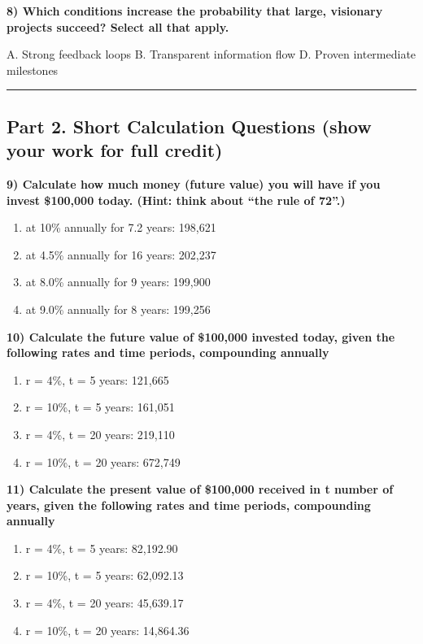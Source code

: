 \documentclass[
  12pt,
]{article}
\providecommand{\tightlist}{%
  \setlength{\itemsep}{0pt}\setlength{\parskip}{0pt}}
\begin{document}
\textbf{8) Which conditions increase the probability that large,
visionary projects succeed? Select all that apply.}

A. Strong feedback loops B. Transparent information flow D. Proven
intermediate milestones

\begin{center}\rule{0.5\linewidth}{0.5pt}\end{center}

\subsection{Part 2. Short Calculation Questions (show your work for full
credit)}\label{part-2.-short-calculation-questions-show-your-work-for-full-credit}

\textbf{9) Calculate how much money (future value) you will have if you
invest \$100,000 today. (Hint: think about ``the rule of 72''.)}

\begin{enumerate}
\def\labelenumi{\alph{enumi}.}
\tightlist
\item
  at 10\% annually for 7.2 years: 198,621
\item
  at 4.5\% annually for 16 years: 202,237
\item
  at 8.0\% annually for 9 years: 199,900
\item
  at 9.0\% annually for 8 years: 199,256
\end{enumerate}

\textbf{10) Calculate the future value of \$100,000 invested today,
given the following rates and time periods, compounding annually}

\begin{enumerate}
\def\labelenumi{\alph{enumi}.}
\tightlist
\item
  r = 4\%, t = 5 years: 121,665
\item
  r = 10\%, t = 5 years: 161,051
\item
  r = 4\%, t = 20 years: 219,110
\item
  r = 10\%, t = 20 years: 672,749
\end{enumerate}

\textbf{11) Calculate the present value of \$100,000 received in t
number of years, given the following rates and time periods, compounding
annually}

\begin{enumerate}
\def\labelenumi{\alph{enumi}.}
\tightlist
\item
  r = 4\%, t = 5 years: 82,192.90
\item
  r = 10\%, t = 5 years: 62,092.13
\item
  r = 4\%, t = 20 years: 45,639.17
\item
  r = 10\%, t = 20 years: 14,864.36
\end{enumerate}
\end{document}
